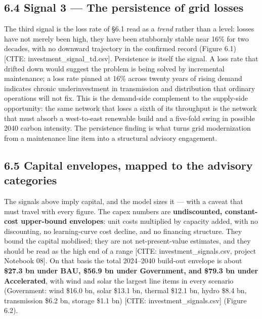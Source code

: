 \documentclass[10pt,twocolumn]{article}
\newcommand{\mk}[1]{{\color{amber}\small #1}}
\begin{document}
\subsection*{6.4 Signal 3 --- The persistence of grid losses}

The third signal is the loss rate of \S{}6.1 read as a \textit{trend} rather than a level: losses have not merely been high, they have been stubbornly stable near 16\% for two decades, with no downward trajectory in the confirmed record (Figure 6.1) \mk{[CITE: investment\_signal\_td.csv]}. Persistence is itself the signal. A loss rate that drifted down would suggest the problem is being solved by incremental maintenance; a loss rate pinned at 16\% across twenty years of rising demand indicates chronic underinvestment in transmission and distribution that ordinary operations will not fix. This is the demand-side complement to the supply-side opportunity: the same network that loses a sixth of its throughput is the network that must absorb a west-to-east renewable build and a five-fold swing in possible 2040 carbon intensity. The persistence finding is what turns grid modernization from a maintenance line item into a structural advisory engagement.

\subsection*{6.5 Capital envelopes, mapped to the advisory categories}

The signals above imply capital, and the model sizes it --- with a caveat that must travel with every figure. The capex numbers are \textbf{undiscounted, constant-cost upper-bound envelopes}: unit costs multiplied by capacity added, with no discounting, no learning-curve cost decline, and no financing structure. They bound the capital mobilised; they are not net-present-value estimates, and they should be read as the high end of a range \mk{[CITE: investment\_signals.csv, project Notebook 08]}. On that basis the total 2024--2040 build-out envelope is about \textbf{\$27.3 bn under BAU, \$56.9 bn under Government, and \$79.3 bn under Accelerated}, with wind and solar the largest line items in every scenario (Government: wind \$16.0 bn, solar \$13.1 bn, thermal \$12.1 bn, hydro \$8.4 bn, transmission \$6.2 bn, storage \$1.1 bn) \mk{[CITE: investment\_signals.csv]} (Figure 6.2).
\end{document}
